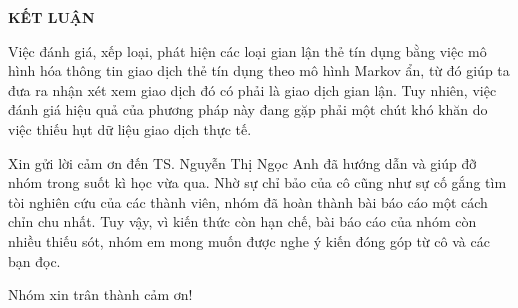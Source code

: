 \centerline{\bf \large\MakeUppercase{Kết luận}}
\vspace{20pt}

\normalsize{
Việc đánh giá, xếp loại, phát hiện các loại gian lận thẻ tín dụng bằng việc mô hình hóa thông tin giao dịch thẻ tín dụng theo mô hình Markov ẩn, từ đó giúp ta đưa ra nhận xét xem giao dịch đó có phải là giao dịch gian lận. Tuy nhiên, việc đánh giá hiệu quả của phương pháp này đang gặp phải một chút khó khăn do việc thiếu hụt dữ liệu giao dịch thực tế.


Xin gửi lời cảm ơn đến TS. Nguyễn Thị Ngọc Anh đã hướng dẫn và giúp đỡ nhóm trong suốt kì học vừa qua. Nhờ sự chỉ bảo của cô cũng như sự cố gắng tìm tòi nghiên cứu của các thành viên, nhóm đã hoàn thành bài báo cáo một cách chỉn chu nhất. Tuy vậy, vì kiến thức còn hạn chế, bài báo cáo của nhóm còn nhiều thiếu sót, nhóm em mong muốn được nghe ý kiến đóng góp từ cô và các bạn đọc.


Nhóm xin trân thành cảm ơn!}
